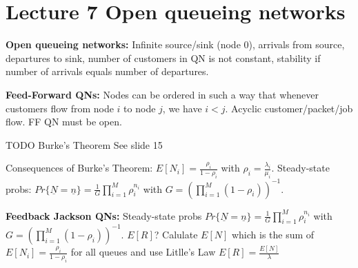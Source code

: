 \section{Lecture 7 Open queueing networks}
\textbf{Open queueing networks:} Infinite source/sink (node 0), arrivals from source,
departures to sink, number of customers in QN is not constant, stability if number of arrivals equals number of departures.

\textbf{Feed-Forward QNs:} Nodes can be ordered in such a way that whenever customers flow from node $i$ to node $j$, we have $i < j$. Acyclic customer/packet/job flow. FF QN must be open.

TODO Burke's Theorem See slide 15

Consequences of Burke's Theorem: $E[N_{i}] = \frac{\rho_i}{1-\rho_i}$ with $\rho_i = \frac{\lambda_i}{\mu_{i}}$.
Steady-state probs: $Pr\{\underline{N} = \underline{n}\} = \frac{1}{G}\prod^{M}_{i=1}\rho_{i}^{n_{i}}$ with $G = (\prod^{M}_{i=1} (1-\rho_{i}))^{-1}$.


\textbf{Feedback Jackson QNs:} Steady-state probs $Pr\{\underline{N} = \underline{n}\} = \frac{1}{G}\prod^{M}_{i=1}\rho_{i}^{n_{i}}$ with $G = (\prod^{M}_{i=1} (1-\rho_{i}))^{-1}$.
$E[R]$? Calulate $E[N]$ which is the sum of $E[N_i] = \frac{\rho_i}{1-\rho_i}$ for all queues and use Litlle's Law $E[R] = \frac{E[N]}{\lambda}$


